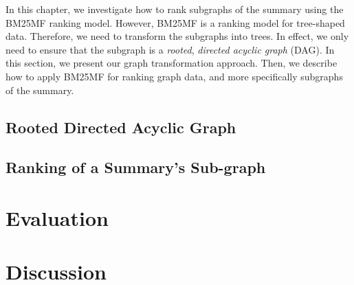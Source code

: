 In this chapter, we investigate how to rank subgraphs of the summary using the \gls{BM25MF} ranking model. However, \gls{BM25MF} is a ranking model for tree-shaped data. Therefore, we need to transform the subgraphs into trees. In effect, we only need to ensure that the subgraph is a \emph{rooted}, \emph{directed acyclic graph} (DAG). In this section, we present our graph transformation approach. Then, we describe how to apply \gls{BM25MF} for ranking graph data, and more specifically subgraphs of the summary.

\subsection{Rooted Directed Acyclic Graph}

\subsection{Ranking of a Summary's Sub-graph}

\section{Evaluation}
\label{chap:summary-ranking:evaluation}

\section{Discussion}
\label{chap:summary-ranking:discuss}

